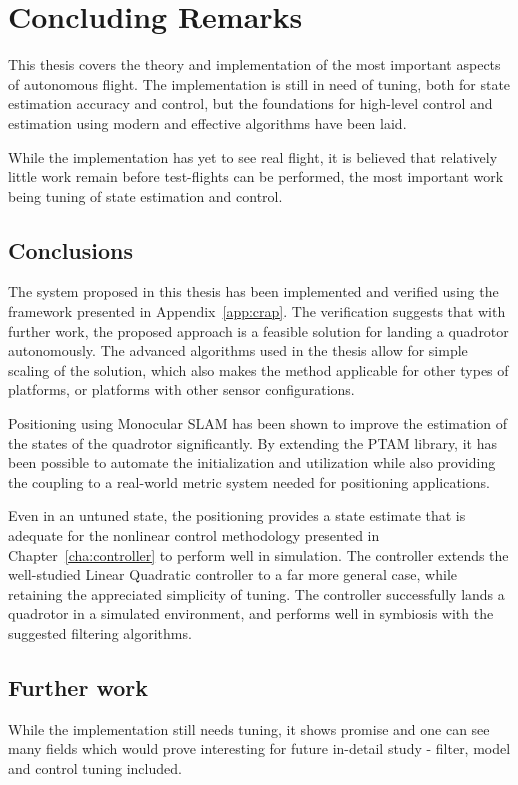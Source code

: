 \chapter{Concluding Remarks}
\label{cha:conclusions}
    This thesis covers the theory and implementation of the most
    important aspects of autonomous flight. The implementation is
    still in need of tuning, both for state estimation accuracy and control,
    but the foundations for high-level control and estimation using
    modern and effective algorithms have been laid.

    While the implementation has yet to see real flight, it is believed
    that relatively little work remain before test-flights can be performed,
    the most important work being tuning of state estimation and control.

\section{Conclusions}
    The system proposed in this thesis has been implemented and verified
    using the framework presented in Appendix~\ref{app:crap}.
    The verification suggests that with further work, the proposed approach
    is a feasible solution for landing a quadrotor autonomously.
    The advanced algorithms used in the thesis allow for
    simple scaling of the solution, which also makes the method applicable
    for other types of platforms, or platforms with other sensor configurations.

    Positioning using Monocular SLAM has been shown to improve the estimation of the states
    of the quadrotor significantly. By extending the PTAM library,
    it has been possible to automate the initialization and utilization
    while also providing the coupling to a real-world metric system needed
    for positioning applications.

    Even in an untuned state, the positioning provides a state estimate
    that is adequate for the nonlinear control methodology presented
    in Chapter~\ref{cha:controller} to perform well in simulation.
    The controller extends the well-studied Linear Quadratic controller
    to a far more general case, while retaining the appreciated simplicity of tuning.
    The controller successfully lands a quadrotor in a simulated environment,
    and performs well in symbiosis with the suggested filtering algorithms.


\section{Further work}
\label{sec:conclusions:furtherwork}
    While the implementation still needs tuning, it shows promise
    and one can see many fields which would prove interesting for
    future in-detail study - filter, model and control tuning included.

